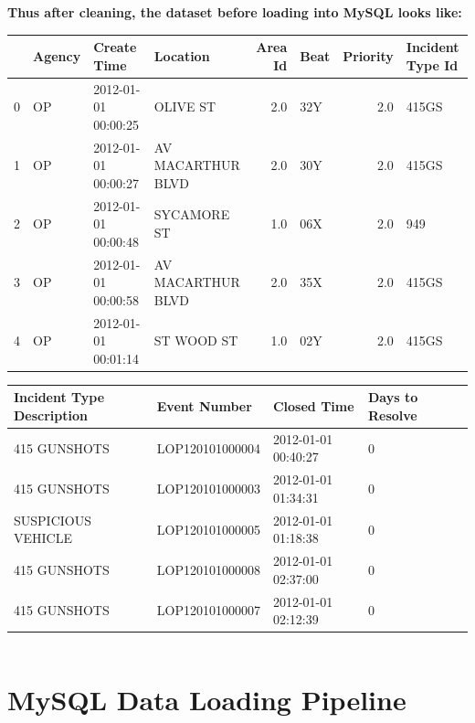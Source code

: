 \documentclass{article} %
\begin{document}
\[\]
\textbf{Thus after cleaning, the dataset before loading into MySQL looks like:}


\begin{tabular}{|l|l|l|l|r|l|r|l|}
	\toprule
	{} & Agency &          Create Time &           Location &  Area Id & Beat &  Priority & Incident Type Id \\
	\midrule
	0 &     OP &  2012-01-01 00:00:25 &           OLIVE ST &      2.0 &  32Y &       2.0 &            415GS \\
	1 &     OP &  2012-01-01 00:00:27 &  AV MACARTHUR BLVD &      2.0 &  30Y &       2.0 &            415GS \\
	2 &     OP &  2012-01-01 00:00:48 &        SYCAMORE ST &      1.0 &  06X &       2.0 &              949 \\
	3 &     OP &  2012-01-01 00:00:58 &  AV MACARTHUR BLVD &      2.0 &  35X &       2.0 &            415GS \\
	4 &     OP &  2012-01-01 00:01:14 &         ST WOOD ST &      1.0 &  02Y &       2.0 &            415GS \\
	\bottomrule
\end{tabular}


\begin{tabular}{|l|l|l|l|r|}
	\toprule
	Incident Type Description &     Event Number &          Closed Time &  Days to Resolve \\
	\midrule
	              415 GUNSHOTS &  LOP120101000004 &  2012-01-01 00:40:27 &                0 \\
	              415 GUNSHOTS &  LOP120101000003 &  2012-01-01 01:34:31 &                0 \\
	        SUSPICIOUS VEHICLE &  LOP120101000005 &  2012-01-01 01:18:38 &                0 \\
	              415 GUNSHOTS &  LOP120101000008 &  2012-01-01 02:37:00 &                0 \\
	              415 GUNSHOTS &  LOP120101000007 &  2012-01-01 02:12:39 &                0 \\
	\bottomrule
\end{tabular}


\[\]


\section{MySQL Data Loading Pipeline}
\end{document}
